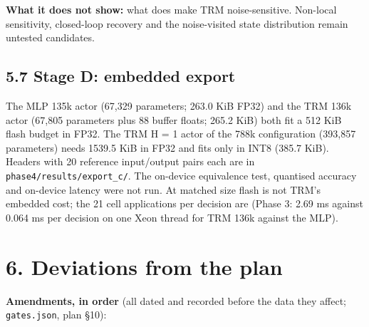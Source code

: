 \documentclass[11pt]{article}
\begin{document}
\textbf{What it does not show:} what does make TRM noise-sensitive. Non-local sensitivity, closed-loop recovery and the noise-visited state distribution remain untested candidates.



\subsection*{5.7 Stage D: embedded export}



The MLP 135k actor (67,329 parameters; 263.0 KiB FP32) and the TRM 136k actor (67,805 parameters plus 88 buffer floats; 265.2 KiB) both fit a 512 KiB flash budget in FP32. The TRM H = 1 actor of the 788k configuration (393,857 parameters) needs 1539.5 KiB in FP32 and fits only in INT8 (385.7 KiB). Headers with 20 reference input/output pairs each are in \texttt{phase4/\allowbreak{}results/\allowbreak{}export\_\allowbreak{}c/\allowbreak{}}. The on-device equivalence test, quantised accuracy and on-device latency were not run. At matched size flash is not TRM's embedded cost; the 21 cell applications per decision are (Phase 3: 2.69 ms against 0.064 ms per decision on one Xeon thread for TRM 136k against the MLP).



\section*{6. Deviations from the plan}



\textbf{Amendments, in order} (all dated and recorded before the data they affect; \texttt{gates.json}, plan \S{}10):
\end{document}
